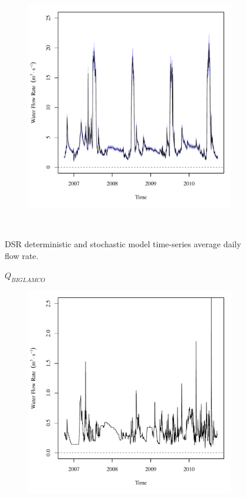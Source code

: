 \begin{linenumbers}
\begin{landscape}
\begin{figure}
\begin{subfigure}{0.7\textwidth}
			\includegraphics[width=\tableCustomSize]{"Figures/Results_DSR/Stochastic/Q out"}
		\end{subfigure}\\
		\caption{DSR deterministic and stochastic model time-series average daily flow rate.}
	\end{figure}
\end{landscape}
\subfiguremid
\begin{landscape}
	\begin{figure}
		\centering
		$ Q_{BIGLAMCO} $
		\begin{subfigure}{0.7\textwidth}
			\centering
			\includegraphics[width=\tableCustomSize]{"Figures/Results_DSR/Deterministic/Q BIG"}

\end{subfigure}
\end{figure}
\end{landscape}
\end{linenumbers}

